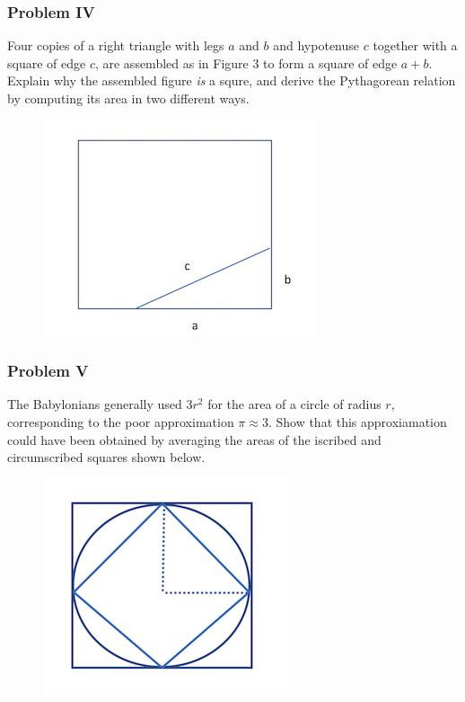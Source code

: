 \documentclass[11pt]{article}
\makeatletter
\def\maxwidth{\ifdim\Gin@nat@width>\linewidth\linewidth
    \else\Gin@nat@width\fi}
\let\Oldincludegraphics\includegraphics
\renewcommand{\includegraphics}[1]{\Oldincludegraphics[width=.8\maxwidth]{#1}}
\makeatother
\begin{document}
    \subsubsection{Problem IV}\label{problem-iv}

Four copies of a right triangle with legs \(a\) and \(b\) and hypotenuse
\(c\) together with a square of edge \(c\), are assembled as in Figure 3
to form a square of edge \(a + b\). Explain why the assembled figure
\emph{is} a squre, and derive the Pythagorean relation by computing its
area in two different ways.

\begin{figure}
\centering
\includegraphics{images/section_I/p3.png}
\caption{}
\end{figure}

    \subsubsection{Problem V}\label{problem-v}

The Babylonians generally used \(3r^2\) for the area of a circle of
radius \(r\), corresponding to the poor approximation \(\pi \approx 3\).
Show that this approxiamation could have been obtained by averaging the
areas of the iscribed and circumscribed squares shown below.

\begin{figure}
\centering
\includegraphics{images/section_I/p4.png}
\caption{}
\end{figure}
\end{document}
